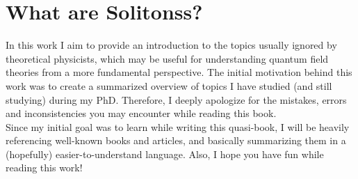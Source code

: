 
\chapter{What are Solitonss?}
In this work I aim to provide an introduction to the topics usually ignored by theoretical physicists, which may be useful for understanding quantum field theories from a more fundamental perspective. The initial motivation behind this work was to create a summarized overview of topics I have studied (and still studying) during my PhD. Therefore, I deeply apologize for the mistakes, errors and inconsistencies you may encounter while reading this book. 
\\
Since my initial goal was to learn while writing this quasi-book, I will be heavily referencing well-known books and articles, and basically summarizing them in a (hopefully) easier-to-understand language. Also, I hope you have fun while reading this work! 

